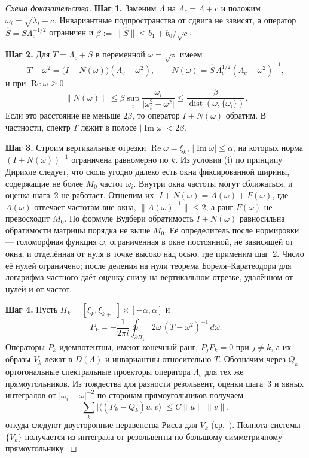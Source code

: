 \documentclass[12pt,a4paper]{article}
\theoremstyle{definition}
\newcommand{\step}[1]{\smallskip\noindent\textbf{Шаг #1.}}
\newcommand{\norm}[1]{\lVert#1\rVert}
\newcommand{\abs}[1]{\lvert#1\rvert}
\newcommand{\inner}[2]{\langle#1,#2\rangle}
\begin{document}
\begin{proof}[Схема доказательства]
\step{1} Заменим $\Lambda$ на $\Lambda_c=\Lambda+c$ и положим
$\omega_i=\sqrt{\lambda_i+c}$. Инвариантные подпространства от сдвига не зависят, а
оператор $\hat S=S\Lambda_c^{-1/2}$ ограничен и
$\beta:=\norm{\hat S}\le b_1+b_0/\sqrt c$.

\step{2} Для $T=\Lambda_c+S$ в переменной $\omega=\sqrt z$ имеем
\[
 T-\omega^2=\bigl(I+N(\omega)\bigr)(\Lambda_c-\omega^2),\qquad
 N(\omega)=\hat S\,\Lambda_c^{1/2}(\Lambda_c-\omega^2)^{-1},
\]
и при $\operatorname{Re}\omega\ge0$
\[
 \norm{N(\omega)}\le\beta\sup_i\frac{\omega_i}{\abs{\omega_i^2-\omega^2}}\le
 \frac{\beta}{\operatorname{dist}(\omega,\{\omega_i\})}.
\]
Если это расстояние не меньше $2\beta$, то оператор $I+N(\omega)$ обратим. В частности,
спектр $T$ лежит в полосе $\abs{\operatorname{Im}\omega}<2\beta$.

\step{3} Строим вертикальные отрезки $\operatorname{Re}\omega=\xi_k$,
$\abs{\operatorname{Im}\omega}\le\alpha$, на которых норма $(I+N(\omega))^{-1}$ ограничена
равномерно по $k$. Из условия (i) по принципу Дирихле следует, что сколь угодно далеко
есть окна фиксированной ширины, содержащие не более $M_0$ частот $\omega_i$. Внутри окна
частоты могут сближаться, и оценка шага~2 не работает. Отщепим их:
$I+N(\omega)=A(\omega)+F(\omega)$, где $A(\omega)$ отвечает частотам вне окна,
$\norm{A(\omega)^{-1}}\le2$, а ранг $F(\omega)$ не превосходит $M_0$. По формуле Вудбери
обратимость $I+N(\omega)$ равносильна обратимости матрицы порядка не выше $M_0$. Её
определитель после нормировки --- голоморфная функция $\omega$, ограниченная в окне
постоянной, не зависящей от окна, и отделённая от нуля в точке высоко над осью, где
применим шаг~2. Число её нулей ограничено; после деления на нули теорема
Бореля--Каратеодори для логарифма частного даёт оценку снизу на вертикальном отрезке,
удалённом от нулей и от частот.

\step{4} Пусть $\Pi_k=[\xi_k,\xi_{k+1}]\times[-\alpha,\alpha]$ и
\[
 P_k=-\frac1{2\pi i}\oint_{\partial\Pi_k}2\omega\,(T-\omega^2)^{-1}\,d\omega .
\]
Операторы $P_k$ идемпотентны, имеют конечный ранг, $P_jP_k=0$ при $j\ne k$, а их образы
$V_k$ лежат в $D(\Lambda)$ и инвариантны относительно $T$. Обозначим через $Q_k$
ортогональные спектральные проекторы оператора $\Lambda_c$ для тех же прямоугольников.
Из тождества для разности резольвент, оценки шага~3 и явных интегралов от
$\abs{\omega_i-\omega}^{-2}$ по сторонам прямоугольников получаем
\[
 \sum_k\abs{\inner{(P_k-Q_k)u}{v}}\le C\norm u\,\norm v ,
\]
откуда следуют двусторонние неравенства Рисса для $V_k$
(ср.~\cite[предложение~3.7]{Wyss}). Полнота системы $\{V_k\}$ получается из интеграла от
резольвенты по большому симметричному прямоугольнику.
\end{proof}
\end{document}
